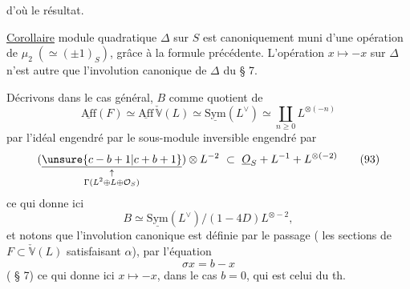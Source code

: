  d'où le résultat.

\uline{Corollaire}   module quadratique $\Delta$ sur $S$ est canoniquement muni d'une opération de $\mu_2\;(\simeq(\pm1)_S)$, grâce à la formule précédente. L'opération $x\mapsto-x$  sur $\Delta$ n'est autre que l'involution canonique de $\Delta$ du § 7.

Décrivons   dans le cas général, $B$ comme quotient de
\[
\underline{\mathrm{Aff}}(F)\simeq\underline{\mathrm{Aff}}\,\check{\mathbb V}(L)\simeq\underline{\mathrm{Sym}}(L^\vee)\simeq\coprod_{n\geq0} L^{\otimes(-n)}
\]
par l'idéal engendré par le sous-module inversible engendré par
\[
(\underset{\substack{\uparrow\\\Gamma(L^2\oplus L\oplus\mathcal O_S)}}{\underline{\unsure{c-b+1|c+b+1}}})\otimes L^{-2}\ \subset\ \underline O_S+L^{-1}+L^{\otimes(-2)}\tag*{$(93)$}
\]
 ce qui donne ici
\[
B\simeq\underline{\mathrm{Sym}}(L^\vee)/(1-4D)L^{\otimes-2},
\]
et notons que l'involution canonique est définie par le passage ( les sections de $F\subset\check{\mathbb V}(L)$ satisfaisant $\alpha$), par l'équation
\[
\sigma x=b-x\tag*{$(94)$}
\]
( § 7) ce qui donne ici $x\mapsto-x$, dans le cas $b=0$, qui est celui du th.
